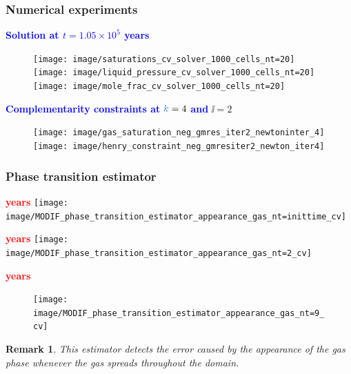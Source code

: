 \documentclass[10 pt]{beamer}
\newtheorem{remark}[theorem]{Remark}
\begin{document}
\begin{frame}
\frametitle{Numerical experiments}
\textcolor{blue}{\textbf{Solution at $t = 1.05 \times 10^{5}$ years}}
\begin{figure}
\centering
\texttt{[image: image/saturations\_cv\_solver\_1000\_cells\_nt=20]}
\texttt{[image: image/liquid\_pressure\_cv\_solver\_1000\_cells\_nt=20]}
\texttt{[image: image/mole\_frac\_cv\_solver\_1000\_cells\_nt=20]}
\end{figure}
\textcolor{blue}{\textbf{Complementarity constraints at}} $\kk = 4$ \textcolor{blue}{\textbf{and}} $\ii = 2$
\begin{figure}
\centering
\texttt{[image: image/gas\_saturation\_neg\_gmres\_iter2\_newtoninter\_4]} \qquad
\texttt{[image: image/henry\_constraint\_neg\_gmresiter2\_newton\_iter4]}
\end{figure}
\end{frame}
%
\begin{frame}
\frametitle{Phase transition estimator}
\begin{minipage}{0.49\textwidth}
\centering
\scriptsize{\textcolor{red}{\textbf{ years}}}
\texttt{[image: image/MODIF\_phase\_transition\_estimator\_appearance\_gas\_nt=inittime\_cv]}
\end{minipage}
\hfill
\begin{minipage}{0.49\textwidth}
\centering
\scriptsize{\textcolor{red}{ \textbf{ years}}} 
\texttt{[image: image/MODIF\_phase\_transition\_estimator\_appearance\_gas\_nt=2\_cv]}
\end{minipage}

 \begin{minipage}{.49 \textwidth}
 \hspace{2 cm}\scriptsize{ \textbf{\textcolor{red}{  years}}}
\vspace{-0.3 cm}
\begin{figure}
\texttt{[image: image/MODIF\_phase\_transition\_estimator\_appearance\_gas\_nt=9\_cv]}
\end{figure}
 \end{minipage}
\begin{minipage}{.49 \textwidth}
\begin{remark}
This estimator detects the error caused by the 
 appearance of the gas phase whenever the gas spreads throughout the domain. 
\end{remark}
\end{minipage}
\end{frame}
\end{document}
